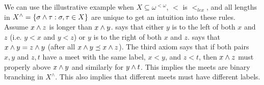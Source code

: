 We can use the illustrative example when $X \subseteq \omega^{<\omega}$, $<$ is $<_{lex}$, and all lengths in $X^\wedge = \{\sigma \wedge \tau: \sigma, \tau \in X \}$ are unique to get an intuition into these rules. Assume $x\wedge z$ is longer than $x\wedge y$.   says that either $y$ is to the left  of both $x$ and $z$ (i.e. $y< x$ and $y < z$) or $y$ is to the right of both $x$ and $z$.  says that $x\wedge y = z \wedge y $ (after all $x \wedge y \preceq x \wedge z$). 
The third axiom  says that if both pairs $x, y$ and $z, t$ have a meet with the same label, $x< y$, and $z < t$, then $x \wedge z$ must properly above $x \wedge y$ and similarly for $y \wedge t$.  This implies the meets are binary branching in $X^\wedge$. This also implies that different meets must have different labels. 





